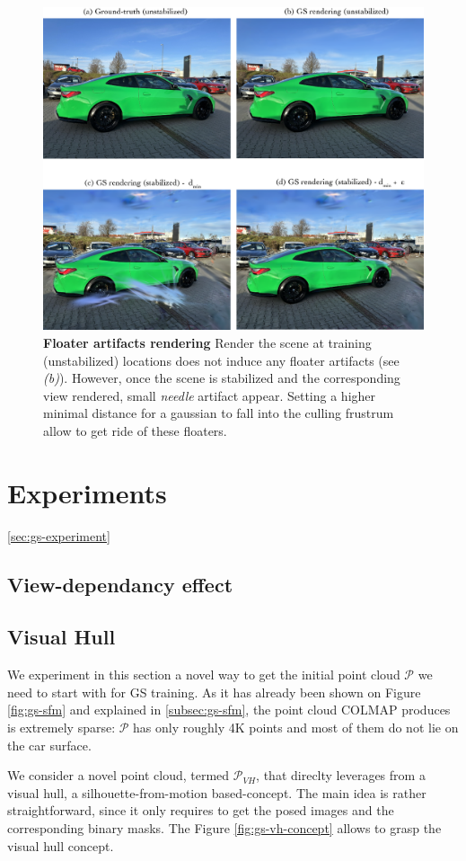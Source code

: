 \begin{figure}[htb!]
  \center
\includegraphics[width=.7\linewidth]{images/gaussiansplatting/gaussian-floaters-results.png}
\caption{\textbf{Floater artifacts rendering} Render the scene at training (unstabilized) locations does not induce any floater artifacts (see \textit{(b)}). However, once the scene is stabilized and the corresponding view rendered, small \textit{needle} artifact appear. Setting a higher minimal distance for a gaussian to fall into the culling frustrum allow to get ride of these floaters.}
\label{fig:gs-floaters}
\end{figure}



\section{Experiments}
\ref{sec:gs-experiment}

\subsection{View-dependancy effect}

\subsection{Visual Hull}
We experiment in this section a novel way to get the initial point cloud $\mathcal{P}$ we need to start with for \ac{GS} training. As it has already been shown on Figure \ref{fig:gs-sfm} and explained in \ref{subsec:gs-sfm}, the point cloud COLMAP produces is extremely sparse: $\mathcal{P}$ has only roughly 4K points and most of them do not lie on the car surface. 

We consider a novel point cloud, termed $\mathcal{P}_{VH}$, that direclty leverages from a visual hull, a silhouette-from-motion based-concept. The main idea is rather straightforward, since it only requires to get the posed images and the corresponding binary masks. The Figure \ref{fig:gs-vh-concept} allows to grasp the visual hull concept. 

